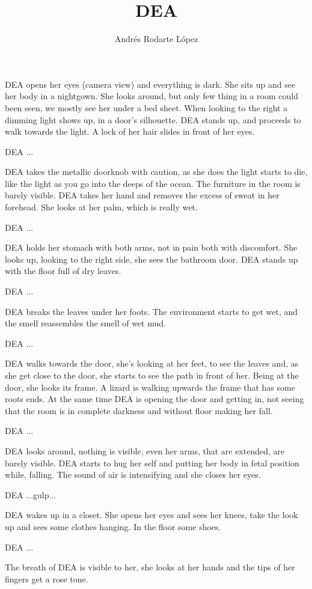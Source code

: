 \documentclass{screenplay}[2012/06/30]
\title{DEA}
\author{Andrés Rodarte López}
\begin{document}
\coverpage
{}
DEA opens her eyes (camera view) and everything is dark. 
She sits up and see her body in a nightgown. 
She looks around, but only few thing in a room could been seen, we mostly see her under a bed sheet. 
When looking to the right a dimming light shows up, in a door's silhouette. DEA stands up, and proceeds
to walk towards the light. A lock of her hair slides in front of her eyes.
\begin{dialogue}{DEA}
    ...
\end{dialogue}
DEA takes the metallic doorknob with caution, as she does the light starts to die, like
the light as you go into the deeps of the ocean. The furniture in the room is barely visible.
\intercut
{}
DEA takes her hand and removes the excess of sweat in her forehead. She looks at her palm, which is really wet.
\begin{dialogue}{DEA}
    ...
\end{dialogue}
DEA holds her stomach with both arms, not in pain both with discomfort. She looks up,
looking to the right side, she sees the bathroom door. DEA stands up with the floor full of 
dry leaves.
\begin{dialogue}{DEA}
    ...
\end{dialogue}
DEA breaks the leaves under her foots. The environment starts to get wet, and the 
smell reassembles the smell of wet mud.
\begin{dialogue}{DEA}
    ...
\end{dialogue}
DEA walks towards the door, she's looking at her feet, to see the leaves and, as she
get close to the door, she starts to see the path in front of her. Being at the door, she looks its frame.
A lizard is walking upwards the frame that has some roots ends. At the same time DEA is opening the door and 
getting in, not seeing that the room is in complete darkness and without floor making her fall.
\begin{dialogue}{DEA}
    ...
\end{dialogue}
DEA looks around, nothing is visible, even her arms, that are extended, are barely visible.
DEA starts to hug her self and putting her body in fetal position while, falling. The sound of air is
intensifying and she closes her eyes.
\begin{dialogue}{DEA}
    ...gulp...
\end{dialogue}
\intercut
{}
DEA wakes up in a closet. She opens her eyes and sees her knees, take the look up and 
sees some clothes hanging. In the floor some shoes.
\begin{dialogue}[Exhalates]{DEA}
    ...
\end{dialogue}
The breath of DEA is visible to her, she looks at her hands and
the tips of her fingers get a rose tone.
\end{document}
